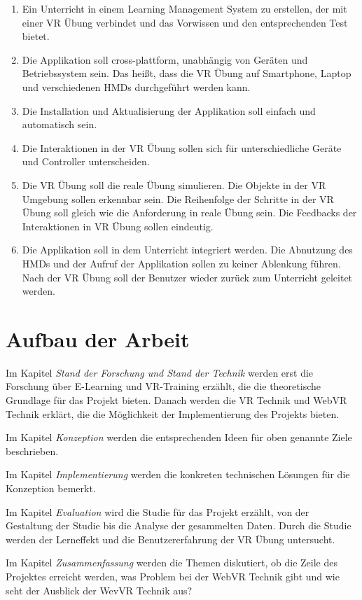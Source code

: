 \begin{enumerate}[labelsep=1ex]
	\renewcommand{\labelenumi}{\textbf{Z\theenumi.}}
	\item Ein Unterricht in einem Learning Management System zu erstellen, der mit einer VR Übung verbindet und das Vorwissen und den entsprechenden Test bietet.
	
	\item Die Applikation soll cross-plattform, unabhängig von Geräten und Betriebssystem sein. Das heißt, dass die VR Übung auf Smartphone, Laptop und verschiedenen HMDs durchgeführt werden kann.
	
	\item Die Installation und Aktualisierung der Applikation soll einfach und automatisch sein.
	
	\item Die Interaktionen in der VR Übung sollen sich für unterschiedliche Geräte und Controller unterscheiden.
	
	\item Die VR Übung soll die reale Übung simulieren. Die Objekte in der VR Umgebung sollen erkennbar sein. Die Reihenfolge der Schritte in der VR Übung soll gleich wie die Anforderung in reale Übung sein. Die Feedbacks der Interaktionen in VR Übung sollen eindeutig.
	
	\item Die Applikation soll in dem Unterricht integriert werden. Die Abnutzung des HMDs und der Aufruf der Applikation sollen zu keiner Ablenkung führen. Nach der VR Übung soll der Benutzer wieder zurück zum Unterricht geleitet werden.
	
\end{enumerate}

\section{Aufbau der Arbeit}
Im Kapitel {\em Stand der Forschung und Stand der Technik} werden erst die Forschung über E-Learning und VR-Training erzählt, die die theoretische Grundlage für das Projekt bieten. Danach werden die VR Technik und WebVR Technik erklärt, die die Möglichkeit der Implementierung des Projekts bieten.

Im Kapitel {\em Konzeption} werden die entsprechenden Ideen für oben genannte Ziele beschrieben. 

Im Kapitel {\em Implementierung} werden die konkreten technischen Lösungen für die Konzeption bemerkt.

Im Kapitel {\em Evaluation} wird die Studie für das Projekt erzählt, von der Gestaltung der Studie bis die Analyse der gesammelten Daten. Durch die Studie werden der Lerneffekt und die Benutzererfahrung der VR Übung untersucht.

Im Kapitel {\em Zusammenfassung} werden die Themen diskutiert, ob die Zeile des Projektes erreicht werden, was Problem bei der WebVR Technik gibt und wie seht der Ausblick der WevVR Technik aus?